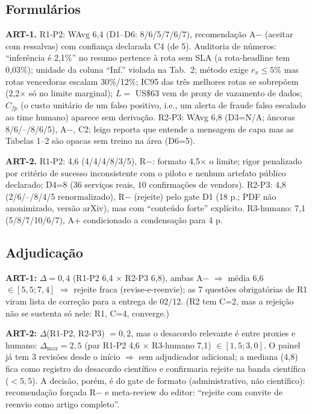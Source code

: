 \documentclass[10pt,a4paper,twocolumn]{article}
\begin{document}
\subsection{Formulários}

\textbf{ART-1.} R1-P2: WAvg 6,4 (D1--D6: 8/6/5/7/6/7), recomendação A$-$ (aceitar com ressalvas) com confiança declarada C4 (de 5). Auditoria de números: ``inferência é 2,1\%'' no resumo pertence à rota sem SLA (a rota-headline tem 0,03\%); unidade da coluna ``Inf.'' violada na Tab.\ 2; método exige $r_\pi \leq 5\%$ mas rotas vencedoras escalam 30\%/12\%; IC95 das três melhores rotas se sobrepõem (2,2$\times$ só no limite marginal); $L =$ US\$63 vem de proxy de vazamento de dados; $C_{fp}$ (o custo unitário de um falso positivo, i.e., um alerta de fraude falso escalado ao time humano) aparece sem derivação. R2-P3: WAvg 6,8 (D3=N/A; âncoras 8/6/--/8/6/5), A$-$, C2; leigo reporta que entende a mensagem de capa mas as Tabelas 1--2 são opacas sem treino na área (D6=5).

\textbf{ART-2.} R1-P2: 4,6 (4/4/4/8/3/5), R$-$: formato 4,5$\times$ o limite; rigor penalizado por critério de sucesso inconsistente com o piloto e nenhum artefato público declarado; D4=8 (36 serviços reais, 10 confirmações de vendors). R2-P3: 4,8 (2/6/--/8/4/5 renormalizado), R$-$ (rejeite) pelo gate D1 (18 p.; PDF não anonimizado, versão arXiv), mas com ``conteúdo forte'' explícito. R3-humano: 7,1 (5/8/7/10/6/7), A+ condicionado a condensação para 4 p.

\subsection{Adjudicação}

\textbf{ART-1:} $\Delta = 0{,}4$ (R1-P2 6,4 $\times$ R2-P3 6,8), ambas A$-$ $\Rightarrow$ média 6,6 $\in [5{,}5; 7{,}4]$ $\Rightarrow$ rejeite fraca (revise-e-reenvie); as 7 questões obrigatórias de R1 viram lista de correção para a entrega de 02/12. (R2 tem C=2, mas a rejeição não se sustenta só nele: R1, C=4, converge.)

\textbf{ART-2:} $\Delta$(R1-P2, R2-P3) $= 0{,}2$, mas o desacordo relevante é entre proxies e humano: $\Delta_{\max} = 2{,}5$ (par R1-P2 4,6 $\times$ R3-humano 7,1) $\in [1{,}5; 3{,}0]$. O painel já tem 3 revisões desde o início $\Rightarrow$ sem adjudicador adicional; a mediana (4,8) fica como registro do desacordo científico e confirmaria rejeite na banda científica ($<5{,}5$). A decisão, porém, é do gate de formato (administrativo, não científico): recomendação forçada R$-$ e meta-review do editor: ``rejeite com convite de reenvio como artigo completo''.
\end{document}
